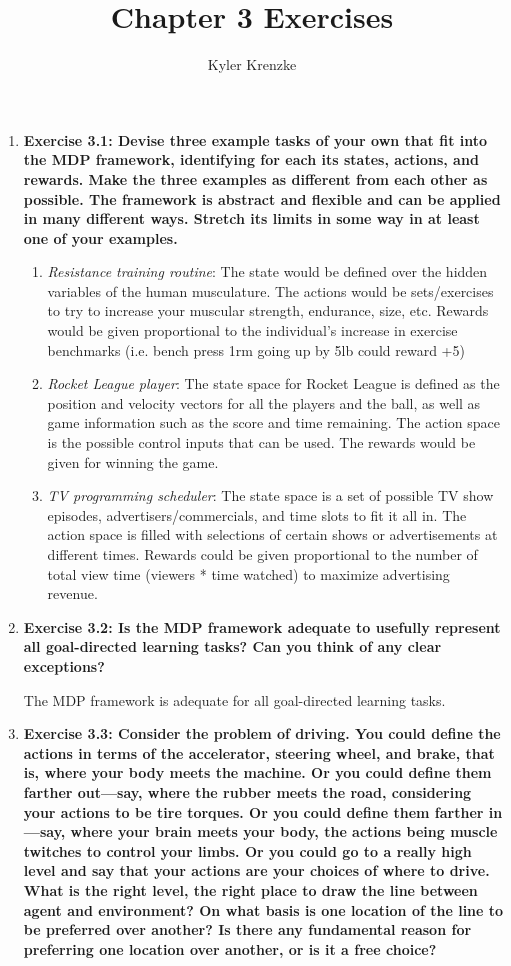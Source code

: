 \documentclass[11pt]{article}
\title{Chapter 3 Exercises}
\author{Kyler Krenzke}
\date{}
\begin{document}
	\maketitle
	
	\begin{enumerate}
	
		\item \textbf{Exercise 3.1: Devise three example tasks of your own that fit into the MDP framework, identifying for each its states, actions, and rewards. Make the three
		examples as different from each other as possible. The framework is abstract and flexible and can be applied in many different ways. Stretch its limits in some way in at
		least one of your examples.}
		\begin{enumerate}
			\item \textit{Resistance training routine}: The state would be defined over the hidden variables of the human musculature. The actions would be sets/exercises to try
			to increase your muscular strength, endurance, size, etc. Rewards would be given proportional to the individual's increase in exercise benchmarks (i.e. bench press 1rm
			going up by 5lb could reward +5)
			\item \textit{Rocket League player}: The state space for Rocket League is defined as the position and velocity vectors for all the players and the ball, as well as
			game information such as the score and time remaining. The action space is the possible control inputs that can be used. The rewards would be given for winning the
			game.
			\item \textit{TV programming scheduler}: The state space is a set of possible TV show episodes, advertisers/commercials, and time slots to fit it all in. The action
			space is filled with selections of certain shows or advertisements at different times. Rewards could be given proportional to the number of total view time (viewers *
			time watched) to maximize advertising revenue.
		\end{enumerate}
		
		\item \textbf{Exercise 3.2: Is the MDP framework adequate to usefully represent all goal-directed learning tasks? Can you think of any clear exceptions?}
		
		The MDP framework is adequate for all goal-directed learning tasks.
		
		\item \textbf{Exercise 3.3: Consider the problem of driving. You could define the actions in terms of the accelerator, steering wheel, and brake, that is, where your body
		meets the machine. Or you could define them farther out—say, where the rubber meets the road, considering your actions to be tire torques. Or you could define them farther
		in—say, where your brain meets your body, the actions being muscle twitches to control your limbs. Or you could go to a really high level and say that your actions are
		your choices of where to drive. What is the right level, the right place to draw the line between agent and environment? On what basis is one location of the line to be
		preferred over another? Is there any fundamental reason for preferring one location over another, or is it a free choice?}
		

\end{enumerate}
\end{document}
